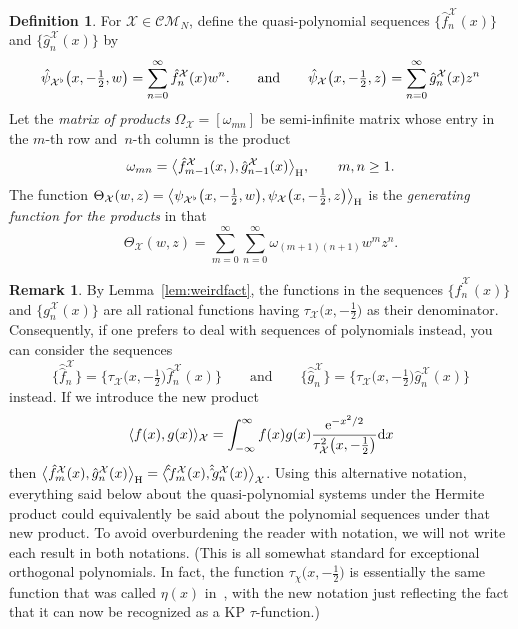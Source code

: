 \documentclass[pdftex]{sigma}
\numberwithin{equation}{section}
\theoremstyle{definition}
\newtheorem{Definition}[Theorem]{Definition}
\newtheorem{Remark}[Theorem]{Remark}
\def\X{\mathcal{X}}
\def\CM{\mathcal{C\!M}}
\def\ff{\hat f}
\def\gg{\hat g}
\def\fff{\hat \ff}
\def\ggg{\hat \gg}
\begin{document}
\begin{Definition}\label{def:seqs}
For $\X\in\CM_N$, define the quasi-polynomial sequences $\big\{\ff_n^{\X}(x)\big\}$ and
$\big\{\gg_n^{\X}(x)\big\}$
by
\[
\hat\psi_{\X^\flat}\bigl(x,-\tfrac{1}{2},w\bigr)=\sum_{n=0}^\infty \ff_n^{\X}(x)w^n.
\qquad\hbox{and}\qquad
\hat\psi_{\X}\bigl(x,-\tfrac{1}{2},z\bigr)=\sum_{n=0}^\infty \gg_n^{\X}(x)z^n
\]
Let the \textit{matrix of products} $\Omega_{\X}=[\omega_{mn}]$ be
 semi-infinite matrix whose entry in the $m$-th row and~$n$-th
 column is the product
 \[
\omega_{mn}=\big\langle \ff_{m-1}^{\X}(x,),\gg_{n-1}^{\X}(x)\big\rangle_{\rm H}, \qquad
m,n\geq 1.
 \]
The function $\Theta_{\X}(w,z)=\bigl\langle \psi_{\X^\flat}\bigl(x,-\tfrac{1}{2},w\bigr),\psi_{\X}\bigl(x,-\tfrac{1}{2},z\bigr)\bigr\rangle_{\rm H}$ is the
\textit{generating function for the products}
 in that
\[
\Theta_{\X}(w,z)=\sum_{m=0}^{\infty}\sum_{n=0}^{\infty}
\omega_{(m+1)(n+1)}w^mz^n.
\]
\end{Definition}

\begin{Remark}\label{rem:quasi}
By Lemma~\ref{lem:weirdfact}, the functions in the sequences $\big\{\ff_n^{\X}(x)\big\}$ and
$\big\{g_n^{\X}(x)\big\}$ are all rational functions having
$\tau_{\X}\bigl(x,-\tfrac{1}{2}\bigr)$ as their
denominator. Consequently, if one prefers to deal with sequences of
polynomials instead, you can consider the sequences
\[
\big\{\fff_n^{\X}\big\}=\bigl\{\tau_{\X}\bigl(x,-\tfrac{1}{2}\bigr)\ff_n^{\X}(x)\bigr\}\qquad\text{and}\qquad
\big\{\ggg_n^{\X}\big\}=\bigl\{\tau_{\X}\bigl(x,-\tfrac{1}{2}\bigr)\gg_n^{\X}(x)\bigr\}
\]
instead.
If we introduce the new product
\[
\langle f(x),g(x)\rangle_{\X}=\int_{-\infty}^{\infty}
f(x)g(x)\frac{{\rm e}^{-x^2/2}}{\tau_{\X}^2\bigl(x,-\tfrac{1}{2}\bigr)}{\rm d}x
\]
then $\big\langle \ff_m^{\X}(x),\gg_n^{\X}(x)\big\rangle_{\rm H}=\big\langle
\fff_m^{\X}(x),\ggg_n^{\X}(x)\big\rangle_{\X}$. Using this alternative
notation, everything said below
about the quasi-polynomial systems under the Hermite product
could equivalently be said about the polynomial sequences under that
new product. To avoid overburdening the reader with notation, we
will not write each result in both notations. (This is all somewhat
standard for exceptional orthogonal polynomials. In fact, the
function $\tau_\chi\bigl(x,-\tfrac{1}{2}\bigr)$ is essentially the same function that was
called $\eta(x)$ in~\cite{XHermite2}, with the new notation just
reflecting the fact that it can now be recognized as a KP $\tau$-function.)
\end{Remark}
\end{document}
